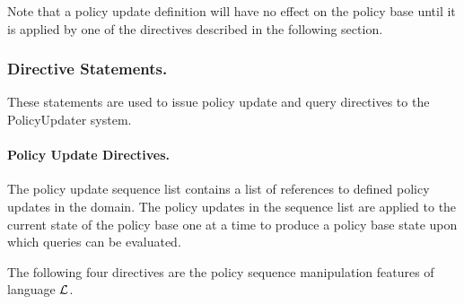 \documentclass[global,twocolumn,final]{svjour}
\begin{document}
          Note that a policy update definition will have no effect on the
          policy base until it is applied by one of the directives described in
          the following section.

        \subsubsection{Directive Statements.}

          These statements are used to issue policy update and query directives
          to the PolicyUpdater system.

        \paragraph{Policy Update Directives.}

        The policy update sequence list contains a list of references to
        defined policy updates in the domain. The policy updates in the
        sequence list are applied to the current state of the policy base one
        at a time to produce a policy base state upon which queries can be
        evaluated.

        The following four directives are the policy sequence manipulation
        features of language $\cal{L}$.
\end{document}
